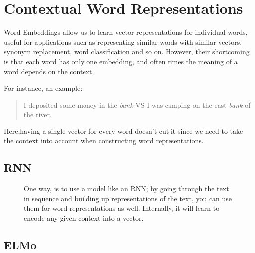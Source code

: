 \documentclass[11pt]{article}
\begin{document}



\begin{figure}[H]
    \centering
\end{figure}    



\tableofcontents

\clearpage

\section{Contextual Word Representations}

Word Embeddings allow us to learn vector representations for individual words, useful for applications such as representing similar words with similar vectors, synonym replacement, word classification and so on. However, their shortcoming is that each word has only one embedding, and often times the meaning of a word depends on the context.

For instance, an example:

\begin{quote}
    I deposited some money in the \emph{bank} VS I was camping on the east \emph{bank} of the river.
\end{quote}

Here,having a single vector for every word doesn't cut it since we need to take the context into account when constructing word representations.

\subsection{RNN}

\begin{figure}[H]
    \centering
    \caption*{One way, is to use a model like an RNN; by going through the text in sequence and building up representations of the text, you can use them for word representations as well. Internally, it will learn to encode any given context into a vector.}
\end{figure}    

\subsection{ELMo}
\end{document}
